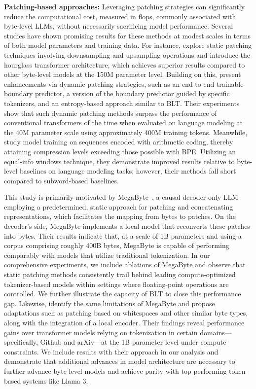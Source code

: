 \textbf{Patching-based approaches:} Leveraging patching strategies can significantly reduce the computational cost, measured in flops, commonly associated with byte-level LLMs, without necessarily sacrificing model performance. Several studies have shown promising results for these methods at modest scales in terms of both model parameters and training data. For instance, \cite{nawrot-etal-2022-hierarchical} explore static patching techniques involving downsampling and upsampling operations and introduce the hourglass transformer architecture, which achieves superior results compared to other byte-level models at the 150M parameter level. Building on this, \cite{nawrot-etal-2023-efficient} present enhancements via dynamic patching strategies, such as an end-to-end trainable boundary predictor, a version of the boundary predictor guided by specific tokenizers, and an entropy-based approach similar to {\textsc BLT}. Their experiments show that such dynamic patching methods surpass the performance of conventional transformers of the time when evaluated on language modeling at the 40M parameter scale using approximately 400M training tokens. Meanwhile, \cite{lester2024training} study model training on sequences encoded with arithmetic coding, thereby attaining compression levels exceeding those possible with BPE. Utilizing an equal-info windows technique, they demonstrate improved results relative to byte-level baselines on language modeling tasks; however, their methods fall short compared to subword-based baselines.

This study is primarily motivated by MegaByte~\citep{yu2023megabyte}, a causal decoder-only LLM employing a predetermined, static approach for patching and concatenating representations, which facilitates the mapping from bytes to patches. On the decoder's side, MegaByte implements a local model that reconverts these patches into bytes. Their results indicate that, at a scale of 1B parameters and using a corpus comprising roughly 400B bytes, MegaByte is capable of performing comparably with models that utilize traditional tokenization. In our comprehensive experiments, we include ablations of MegaByte and observe that static patching methods consistently trail behind leading compute-optimized tokenizer-based models within settings where floating-point operations are controlled. We further illustrate the capacity of {\textsc BLT} to close this performance gap. Likewise, \cite{slagle2024spacebyte} identify the same limitations of MegaByte and propose adaptations such as patching based on whitespaces and other similar byte types, along with the integration of a local encoder. Their findings reveal performance gains over transformer models relying on tokenization in certain domains—specifically, Github and arXiv—at the 1B parameter level under compute constraints. We include results with their approach in our analysis and demonstrate that additional advances in model architecture are necessary to further advance byte-level models and achieve parity with top-performing token-based systems like Llama 3.

